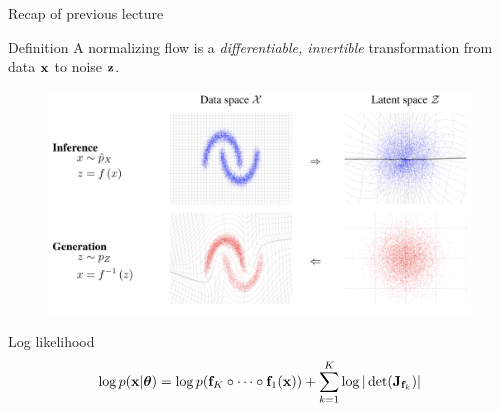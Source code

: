 \documentclass{beamer}
\begin{document}
\begin{frame}{Recap of previous lecture}
	\begin{block}{Definition}
		A normalizing flow is a \textit{differentiable, invertible} transformation from data $\mathbf{x}$ to noise $\mathbf{z}$. 
	\end{block}
	\vspace{-0.1cm}
	\begin{figure}
		\includegraphics[width=0.85\linewidth]{figs/flows_how2}
	\end{figure}
	\vspace{-0.5cm}
	\begin{block}{Log likelihood}
		\vspace{-0.5cm}
		\[
			\log p(\mathbf{x} | \boldsymbol{\theta}) = \log p(\mathbf{f}_K \circ \dots \circ \mathbf{f}_1(\mathbf{x})) + \sum_{k=1}^K\log |\det (\mathbf{J}_{\mathbf{f}_k})|
		\]
	\end{block}
\end{frame}
\end{document}
